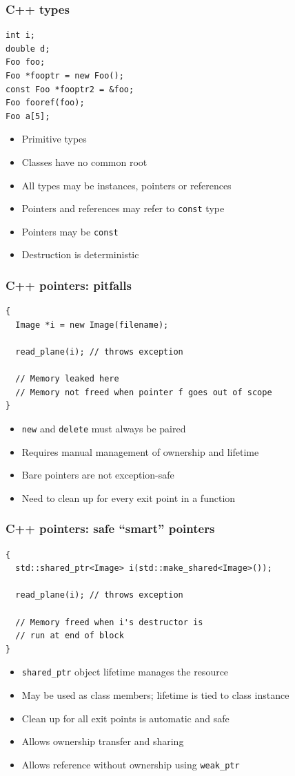 \documentclass{beamer}
\begin{document}
\begin{frame}[fragile]
  \frametitle{C++ types}
  \begin{lstlisting}
int i;
double d;
Foo foo;
Foo *fooptr = new Foo();
const Foo *fooptr2 = &foo;
Foo fooref(foo);
Foo a[5];
\end{lstlisting}
  \begin{itemize}
  \item Primitive types
  \item Classes have no common root
  \item All types may be instances, pointers or references
  \item Pointers and references may refer to \texttt{const} type
  \item Pointers may be \texttt{const}
  \item Destruction is deterministic
  \end{itemize}
\end{frame}

\begin{frame}[fragile]
  \frametitle{C++ pointers: pitfalls}
  \begin{lstlisting}
{
  Image *i = new Image(filename);

  read_plane(i); // throws exception

  // Memory leaked here
  // Memory not freed when pointer f goes out of scope
}
\end{lstlisting}
  \begin{itemize}
    \item \texttt{new} and \texttt{delete} must always be paired
    \item Requires manual management of ownership and lifetime
    \item Bare pointers are not exception-safe
    \item Need to clean up for every exit point in a function
  \end{itemize}
\end{frame}

\begin{frame}[fragile]
  \frametitle{C++ pointers: safe ``smart'' pointers}
  \begin{lstlisting}
{
  std::shared_ptr<Image> i(std::make_shared<Image>());

  read_plane(i); // throws exception

  // Memory freed when i's destructor is
  // run at end of block
}

\end{lstlisting}
  \begin{itemize}
    \item \texttt{shared\_ptr} object lifetime manages the resource
    \item May be used as class members; lifetime is tied to class instance
    \item Clean up for all exit points is automatic and safe
    \item Allows ownership transfer and sharing
    \item Allows reference without ownership using \texttt{weak\_ptr}
  \end{itemize}
\end{frame}
\end{document}
